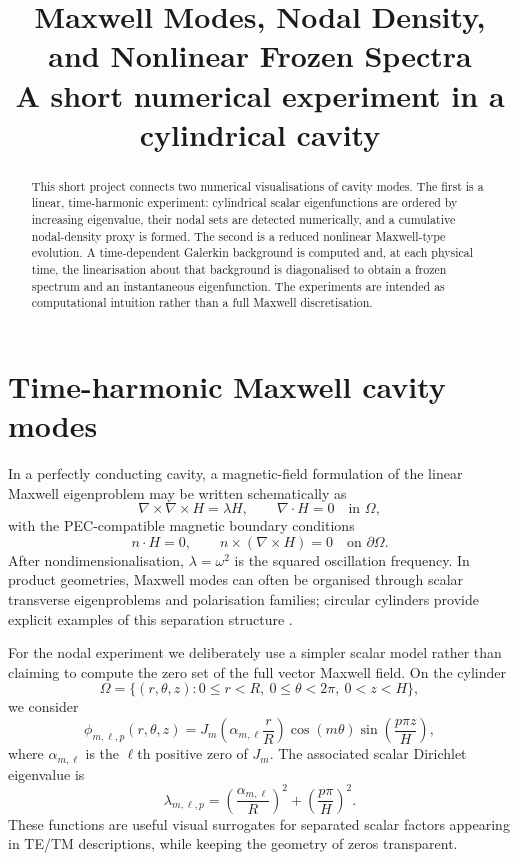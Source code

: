 \documentclass[10pt]{article}
\title{\vspace{-1.2cm}\textbf{Maxwell Modes, Nodal Density, and Nonlinear Frozen Spectra}\\\large A short numerical experiment in a cylindrical cavity}
\author{}
\date{}
\begin{document}
\maketitle
\vspace{-1.0cm}

\begin{abstract}
This short project connects two numerical visualisations of cavity modes.  The first is a linear, time-harmonic experiment: cylindrical scalar eigenfunctions are ordered by increasing eigenvalue, their nodal sets are detected numerically, and a cumulative nodal-density proxy is formed.  The second is a reduced nonlinear Maxwell-type evolution.  A time-dependent Galerkin background is computed and, at each physical time, the linearisation about that background is diagonalised to obtain a frozen spectrum and an instantaneous eigenfunction.  The experiments are intended as computational intuition rather than a full Maxwell discretisation.
\end{abstract}

\section{Time-harmonic Maxwell cavity modes}
In a perfectly conducting cavity, a magnetic-field formulation of the linear Maxwell eigenproblem may be written schematically as
\begin{equation}
\nabla\times\nabla\times H=\lambda H,
\qquad \nabla\cdot H=0 \quad\text{in }\Omega,
\end{equation}
with the PEC-compatible magnetic boundary conditions
\begin{equation}
n\cdot H=0,
\qquad n\times(\nabla\times H)=0
\quad\text{on }\partial\Omega.
\end{equation}
After nondimensionalisation, $\lambda=\omega^2$ is the squared oscillation frequency.  In product geometries, Maxwell modes can often be organised through scalar transverse eigenproblems and polarisation families; circular cylinders provide explicit examples of this separation structure \cite{costabeldauge,monk}.

For the nodal experiment we deliberately use a simpler scalar model rather than claiming to compute the zero set of the full vector Maxwell field.  On the cylinder
\[
\Omega=\{(r,\theta,z):0\le r<R,\ 0\le \theta<2\pi,\ 0<z<H\},
\]
we consider
\begin{equation}
\phi_{m,\ell,p}(r,\theta,z)=
J_m\!\left(\alpha_{m,\ell}\frac rR\right)
\cos(m\theta)
\sin\!\left(\frac{p\pi z}{H}\right),
\end{equation}
where $\alpha_{m,\ell}$ is the $\ell$th positive zero of $J_m$.  The associated scalar Dirichlet eigenvalue is
\begin{equation}
\lambda_{m,\ell,p}=
\left(\frac{\alpha_{m,\ell}}{R}\right)^2+
\left(\frac{p\pi}{H}\right)^2.
\end{equation}
These functions are useful visual surrogates for separated scalar factors appearing in TE/TM descriptions, while keeping the geometry of zeros transparent.
\end{document}

